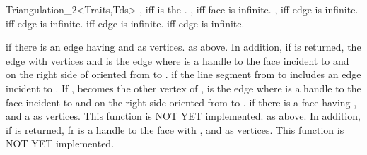 \begin{ccClassTemplate}{Triangulation_2<Traits,Tds>}
{, iff  is the .}
\ccGlue
{}
{, iff face  is infinite.}
\ccGlue
{}
{, iff edge  is infinite.}
\ccGlue
{}
{ iff edge  is infinite.}
\ccGlue
{}
{ iff edge  is infinite.}
\ccGlue
{}
{ iff edge  is infinite.}


{ if there is an edge having  and  as
vertices.}
\ccGlue
{}
{ as above. In addition, if  is returned,  the edge with
vertices  and  is the edge  where
 is a handle to the face incident to  and 
on the right side of   oriented from  to .}
\ccGlue
{}
{ if the line segment from  to  includes
an edge  incident to . If ,  becomes
the other vertex of ,  is the edge  where
 is a handle to the face incident to  and 
on the right side  oriented from  to .}
\ccGlue
{}
{ if there is a face having ,  and a 
as vertices. This function is NOT YET implemented.}
\ccGlue
{}
{as above. In addition, if  is returned, fr is a handle
to the face with  ,  and  
as vertices. This function is NOT YET implemented.} 




\end{ccClassTemplate}
